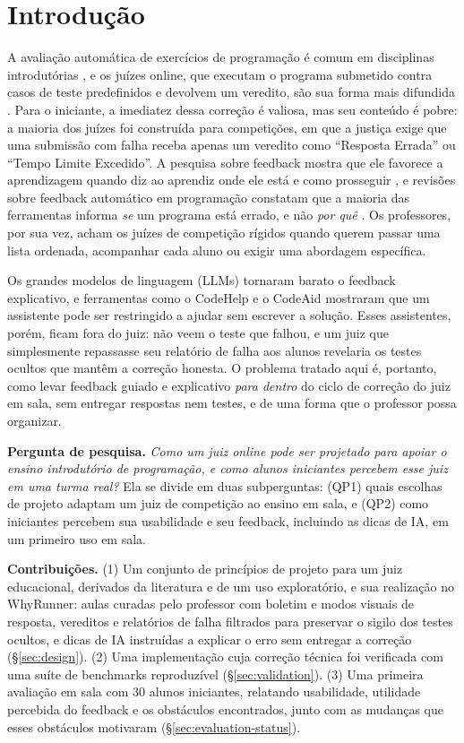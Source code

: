 \documentclass[12pt]{article}
\begin{document}
\section{Introdução}

A avaliação automática de exercícios de programação é comum em disciplinas introdutórias \cite{alamutka2005survey,ihantola2010review}, e os juízes online, que executam o programa submetido contra casos de teste predefinidos e devolvem um veredito, são sua forma mais difundida \cite{wasik2018survey}. Para o iniciante, a imediatez dessa correção é valiosa, mas seu conteúdo é pobre: a maioria dos juízes foi construída para competições, em que a justiça exige que uma submissão com falha receba apenas um veredito como ``Resposta Errada'' ou ``Tempo Limite Excedido''. A pesquisa sobre feedback mostra que ele favorece a aprendizagem quando diz ao aprendiz onde ele está e como prosseguir \cite{hattie2007power}, e revisões sobre feedback automático em programação constatam que a maioria das ferramentas informa \emph{se} um programa está errado, e não \emph{por quê} \cite{keuning2018systematic}. Os professores, por sua vez, acham os juízes de competição rígidos quando querem passar uma lista ordenada, acompanhar cada aluno ou exigir uma abordagem específica.

Os grandes modelos de linguagem (LLMs) tornaram barato o feedback explicativo, e ferramentas como o CodeHelp \cite{liffiton2023codehelp} e o CodeAid \cite{kazemitabaar2024codeaid} mostraram que um assistente pode ser restringido a ajudar sem escrever a solução. Esses assistentes, porém, ficam fora do juiz: não veem o teste que falhou, e um juiz que simplesmente repassasse seu relatório de falha aos alunos revelaria os testes ocultos que mantêm a correção honesta. O problema tratado aqui é, portanto, como levar feedback guiado e explicativo \emph{para dentro} do ciclo de correção do juiz em sala, sem entregar respostas nem testes, e de uma forma que o professor possa organizar.

\textbf{Pergunta de pesquisa.} \emph{Como um juiz online pode ser projetado para apoiar o ensino introdutório de programação, e como alunos iniciantes percebem esse juiz em uma turma real?} Ela se divide em duas subperguntas: (QP1) quais escolhas de projeto adaptam um juiz de competição ao ensino em sala, e (QP2) como iniciantes percebem sua usabilidade e seu feedback, incluindo as dicas de IA, em um primeiro uso em sala.

\textbf{Contribuições.} (1) Um conjunto de princípios de projeto para um juiz educacional, derivados da literatura e de um uso exploratório, e sua realização no WhyRunner: aulas curadas pelo professor com boletim e modos visuais de resposta, vereditos e relatórios de falha filtrados para preservar o sigilo dos testes ocultos, e dicas de IA instruídas a explicar o erro sem entregar a correção (\S\ref{sec:design}). (2) Uma implementação cuja correção técnica foi verificada com uma suíte de benchmarks reproduzível (\S\ref{sec:validation}). (3) Uma primeira avaliação em sala com 30 alunos iniciantes, relatando usabilidade, utilidade percebida do feedback e os obstáculos encontrados, junto com as mudanças que esses obstáculos motivaram (\S\ref{sec:evaluation-status}).
\end{document}
